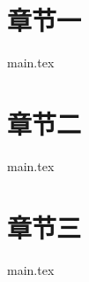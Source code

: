 \documentclass{report}
\begin{document}



\tableofcontents
\newpage


\chapter{章节一}
{main.tex}

\chapter{章节二}
{main.tex}

\chapter{章节三}
{main.tex}
\end{document}
